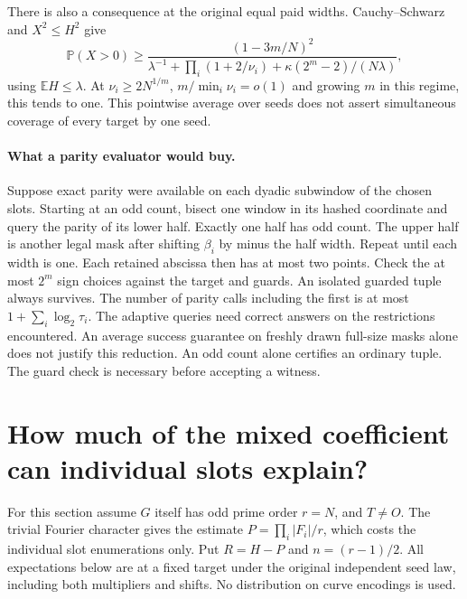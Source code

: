 \documentclass[11pt]{article}
\newcommand{\E}{\mathbb E}
\newcommand{\Prb}{\mathbb P}
\begin{document}
There is also a consequence at the original equal paid widths.
Cauchy--Schwarz and $X^2\le H^2$ give
\[
 \Prb(X>0)\ge
 \frac{(1-3m/N)^2}
 {\lambda^{-1}+\prod_i(1+2/\nu_i)+\kappa(2^m-2)/(N\lambda)} ,
\]
using $\E H\le\lambda$. At $\nu_i\ge2N^{1/m}$,
$m/\min_i\nu_i=o(1)$ and growing $m$ in this regime, this tends to
one. This pointwise average over seeds does not assert simultaneous
coverage of every target by one seed.

\paragraph{What a parity evaluator would buy.}
Suppose exact parity were available on each dyadic subwindow of the
chosen slots. Starting at an odd count, bisect one window in its
hashed coordinate and query the parity of its lower half. Exactly one
half has odd count. The upper half is another legal mask after shifting
$\beta_i$ by minus the half width. Repeat until each width is one.
Each retained abscissa then has at most two points. Check the at most
$2^m$ sign choices against the target and guards. An isolated guarded
tuple always survives. The number of parity calls including the first
is at most $1+\sum_i\log_2\tau_i$. The adaptive queries need correct
answers on the restrictions encountered. An average success guarantee
on freshly drawn full-size masks alone does not justify this reduction.
An odd count alone certifies an ordinary tuple. The guard check is
necessary before accepting a witness.

\section{How much of the mixed coefficient can individual slots explain?}

For this section assume $G$ itself has odd prime order $r=N$, and $T\ne O$.
The trivial Fourier character gives the estimate
$P=\prod_i|F_i|/r$, which costs the individual slot enumerations only.
Put $R=H-P$ and $n=(r-1)/2$. All expectations below are at a fixed
target under the original independent seed law, including both
multipliers and shifts. No distribution on curve encodings is used.
\end{document}
